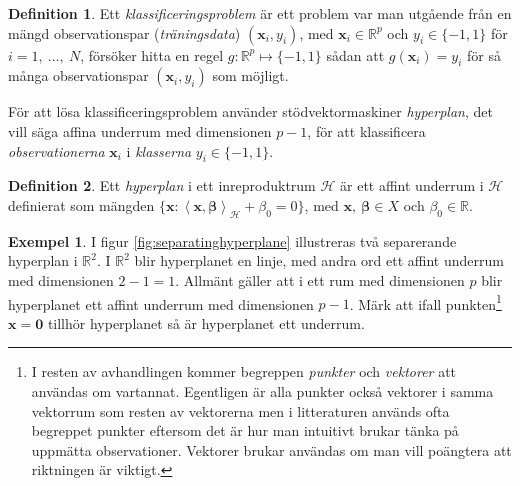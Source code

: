 \documentclass[a4paper, 12pt]{report}
\theoremstyle{definition}
\newtheorem{defi}{Definition}[section]
\newtheorem{ex}{Exempel}[section]
\theoremstyle{remark}
\newcommand{\bfbeta}{{\boldsymbol{\beta}}}
\newcommand{\bfx}{\mathbf{x}}
\newcommand{\llangle}{\left\langle}
\newcommand{\rrangle}{\right\rangle}
\newcommand{\inner}[2]{\llangle #1, #2 \rrangle}
\newcommand{\hil}{\mathcal{H}}
\begin{document}
\begin{defi}
	Ett \textit{klassificeringsproblem} är ett problem var man utgående från en mängd observationspar (\textit{träningsdata}) $\left(\mathbf{x}_i, y_i\right)$, med $\mathbf{x}_i\in\mathbb{R}^p$ och $y_i\in\{-1, 1\}$ för $i=1,~\dots,~N$, försöker hitta en regel $g: \mathbb{R}^p \longmapsto \{-1, 1\}$ sådan att $g\left(\mathbf{x}_i\right)=y_i$ för så många observationspar $\left(\mathbf{x}_i, y_i\right)$ som möjligt.
\end{defi}

För att lösa klassificeringsproblem använder stödvektormaskiner \emph{hyper\-plan}, det vill säga affina underrum med dimensionen $p-1$, för att klassificera \textit{observationerna} $\mathbf{x}_i$ i \textit{klasserna} $y_i\in\{-1, 1\}$.

\begin{defi}
	Ett \textit{hyperplan} i ett inreproduktrum $\mathcal{H}$ är ett affint underrum i $\mathcal{H}$ definierat som mängden $\{\mathbf{x}: \inner{\bfx}{\bfbeta}_\mathcal{H} + \beta_0=0\}$, med $\mathbf{x},~\bfbeta\in X$ och $\beta_0\in\mathbb{R}$.
\end{defi}

\begin{ex}
	I figur \ref{fig:separatinghyperplane} illustreras två separerande hyperplan i $\mathbb{R}^2$. I $\mathbb{R}^2$ blir hyperplanet en linje, med andra ord ett affint underrum med dimensionen $2-1=1$.
	Allmänt gäller att i ett rum med dimensionen $p$ blir hyperplanet ett affint underrum med dimensionen $p-1$.
	Märk att ifall punkten\footnote{I resten av avhandlingen kommer begreppen \emph{punkter} och \emph{vektorer} att användas om vartannat. Egentligen är alla punkter också vektorer i samma vektorrum som resten av vektorerna men i litteraturen används ofta begreppet punkter eftersom det är hur man intuitivt brukar tänka på uppmätta observationer. Vektorer brukar användas om man vill poängtera att riktningen är viktigt.} $\bfx = \mathbf{0}$ tillhör hyperplanet så är hyperplanet ett underrum.
\end{ex}
\end{document}

